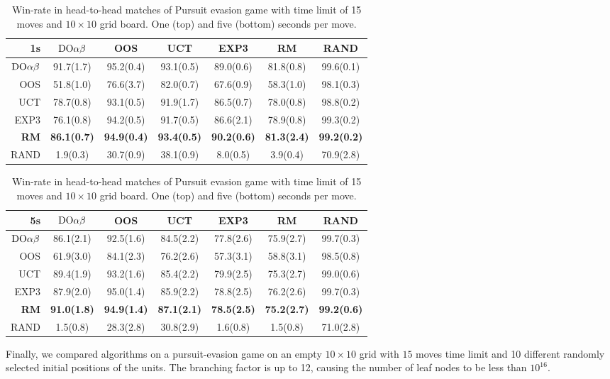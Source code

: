 \begin{table}
\centering
\begin{scriptsize}
\begin{tabular}{|r|cccccc|}\hline
1s&$\textrm{DO}\alpha\beta$&OOS&UCT&EXP3&RM&RAND\\\hline
$\textrm{DO}\alpha\beta$&91.7(1.7)&95.2(0.4)&93.1(0.5)&89.0(0.6)&81.8(0.8)&99.6(0.1)\\
OOS&51.8(1.0)&76.6(3.7)&82.0(0.7)&67.6(0.9)&58.3(1.0)&98.1(0.3)\\
UCT&78.7(0.8)&93.1(0.5)&91.9(1.7)&86.5(0.7)&78.0(0.8)&98.8(0.2)\\
EXP3&76.1(0.8)&94.2(0.5)&91.7(0.5)&86.6(2.1)&78.9(0.8)&99.3(0.2)\\
\textbf{RM}&\textbf{86.1(0.7)}&\textbf{94.9(0.4)}&\textbf{93.4(0.5)}&\textbf{90.2(0.6)}&\textbf{81.3(2.4)}&\textbf{99.2(0.2)}\\
RAND&1.9(0.3)&30.7(0.9)&38.1(0.9)&8.0(0.5)&3.9(0.4)&70.9(2.8)\\
\hline
\end{tabular}
\begin{tabular}{|r|cccccc|}\hline
5s&$\textrm{DO}\alpha\beta$&OOS&UCT&EXP3&RM&RAND\\\hline
$\textrm{DO}\alpha\beta$&86.1(2.1)&92.5(1.6)&84.5(2.2)&77.8(2.6)&75.9(2.7)&99.7(0.3)\\
OOS&61.9(3.0)&84.1(2.3)&76.2(2.6)&57.3(3.1)&58.8(3.1)&98.5(0.8)\\
UCT&89.4(1.9)&93.2(1.6)&85.4(2.2)&79.9(2.5)&75.3(2.7)&99.0(0.6)\\
EXP3&87.9(2.0)&95.0(1.4)&85.9(2.2)&78.8(2.5)&76.2(2.6)&99.7(0.3)\\
\textbf{RM}&\textbf{91.0(1.8)}&\textbf{94.9(1.4)}&\textbf{87.1(2.1)}&\textbf{78.5(2.5)}&\textbf{75.2(2.7)}&\textbf{99.2(0.6)}\\
RAND&1.5(0.8)&28.3(2.8)&30.8(2.9)&1.6(0.8)&1.5(0.8)&71.0(2.8)\\
\hline
\end{tabular}

\end{scriptsize}
\caption{Win-rate in head-to-head matches of Pursuit evasion game with time limit of 15 moves and $10\times 10$ grid board. One (top) and five (bottom) seconds per move.}\label{fig:matches:peg}
\end{table}


Finally, we compared algorithms on a pursuit-evasion game on an empty $10\times 10$ grid with $15$ moves time limit and 10 different randomly selected initial positions of the units. The branching factor is up to 12, causing the number of leaf nodes to be less than $10^{16}$.

